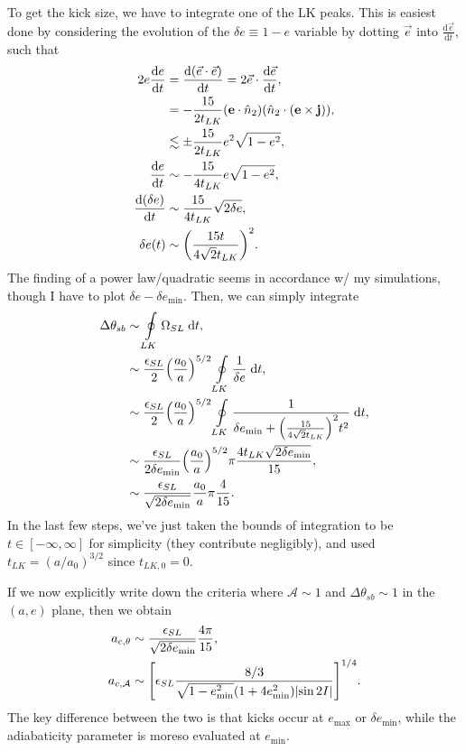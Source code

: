 \documentclass[11pt,
        usenames, %
        dvipsnames %
    ]{article}
\newcommand*{\rd}[2]{\frac{\mathrm{d}#1}{\mathrm{d}#2}}
\newcommand*{\bm}[1]{\boldsymbol{\mathbf{#1}}}
\DeclarePairedDelimiter\abs{\lvert}{\rvert}
\DeclarePairedDelimiter\p{\lparen}{\rparen}
\DeclarePairedDelimiter\s{\lbrack}{\rbrack}
\begin{document}
To get the kick size, we have to integrate one of the LK peaks. This is easiest
done by considering the evolution of the $\delta e \equiv 1 - e$ variable by
dotting $\vec{e}$ into $\rd{\vec{e}}{t}$, such that
\begin{align}
    2e\rd{e}{t} &= \rd{\p*{\vec{e} \cdot \vec{e}}}{t}
        = 2\vec{e} \cdot \rd{\vec{e}}{t},\\
        &= -\frac{15}{2t_{LK}}\p*{\bm{e} \cdot \hat{n}_2}
            \p*{\hat{n}_2 \cdot \p*{\bm{e} \times \bm{j}}},\\
        &\lesssim \pm\frac{15}{2t_{LK}}e^2\sqrt{1 - e^2},\\
    \rd{e}{t} &\sim -\frac{15}{4t_{LK}}e\sqrt{1 - e^2},\\
    \rd{(\delta e)}{t} &\sim \frac{15}{4t_{LK}}\sqrt{2\delta e},\\
    \delta e(t) &\sim \p*{\frac{15 t}{4\sqrt{2}t_{LK}}}^2.
\end{align}
The finding of a power law/quadratic seems in accordance w/ my simulations,
though I have to plot $\delta e - \delta e_{\min}$. Then, we can simply
integrate
\begin{align}
    \Delta \theta_{sb} &\sim \oint\limits_{LK}
            \Omega_{SL}\;\mathrm{d}t,\\
        &\sim \frac{\epsilon_{SL}}{2}\p*{\frac{a_0}{a}}^{5/2}
            \oint\limits_{LK} \frac{1}{\delta e}\;\mathrm{d}t,\\
        &\sim \frac{\epsilon_{SL}}{2}\p*{\frac{a_0}{a}}^{5/2}
            \oint\limits_{LK}
            \frac{1}{\delta e_{\min} + \p*{\frac{15}{4\sqrt{2}t_{LK}}}^2
                t^2}\;\mathrm{d}t,\\
        &\sim \frac{\epsilon_{SL}}{2 \delta e_{\min}}\p*{\frac{a_0}{a}}^{5/2}
            \pi \frac{4t_{LK} \sqrt{2 \delta e_{\min}}}{15},\\
        &\sim \frac{\epsilon_{SL}}{\sqrt{2\delta e_{\min}}}\frac{a_0}{a}
            \pi \frac{4}{15}.
\end{align}
In the last few steps, we've just taken the bounds of integration to be $t \in
[-\infty, \infty]$ for simplicity (they contribute negligibly), and used $t_{LK}
= (a / a_0)^{3/2}$ since $t_{LK, 0} = 0$.

If we now explicitly write down the criteria where $\mathcal{A} \sim 1$ and
$\Delta \theta_{sb} \sim 1$ in the $(a, e)$ plane, then we obtain
\begin{align}
    a_{c,\theta} &\sim \frac{\epsilon_{SL}}{\sqrt{2\delta e_{\min}}}
        \frac{4\pi}{15},\\
    a_{c, \mathcal{A}} &\sim
        \s*{\epsilon_{SL}\frac{8/3}{\sqrt{1 - e_{\min}^2}
            \p*{1 + 4e_{\min}^2}\abs*{\sin 2I}}}^{1/4}.
\end{align}
The key difference between the two is that kicks occur at $e_{\max}$ or $\delta
e_{\min}$, while the adiabaticity parameter is moreso evaluated at $e_{\min}$.
\end{document}
